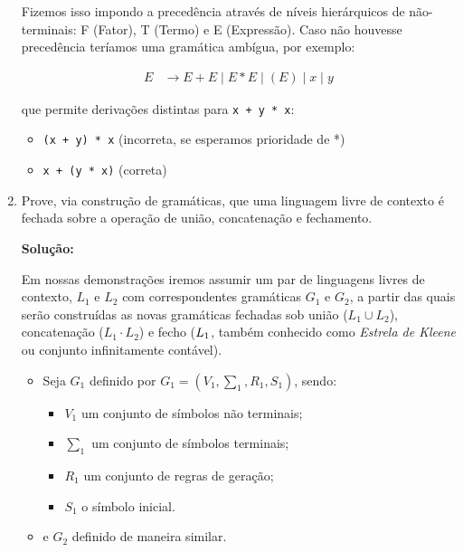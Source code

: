 \documentclass[12pt]{article}
\begin{document}
\begin{enumerate}
	      Fizemos isso impondo a precedência através de níveis hierárquicos de não-terminais: F (Fator), T (Termo) e E (Expressão). Caso não houvesse precedência teríamos uma gramática ambígua, por exemplo:
	      
	      \begin{align*}
		      E & \rightarrow E + E \mid E * E \mid (E) \mid x \mid y
	      \end{align*}
	      
	      que permite derivações distintas para \texttt{x + y * x}:
	      \begin{itemize}
		      \item \texttt{(x + y) * x} (incorreta, se esperamos prioridade de *)
		      \item \texttt{x + (y * x)} (correta)
	      \end{itemize}
	      
	\item Prove, via construção de gramáticas, que uma linguagem livre de contexto é fechada sobre a operação de união, concatenação e fechamento.
	      
	      \textbf{Solução:}
	      
	      Em nossas demonstrações iremos assumir um par de linguagens livres de
	      contexto, $L_1$ e $L_2$ com correspondentes gramáticas $G_1$ e $G_2$,
	      a partir das quais serão construídas as novas gramáticas fechadas sob
	      união ($L_1 \cup L_2$), concatenação ($L_1 \cdot L_2$) e fecho
	      ($L_1\*$, também conhecido como \textit{Estrela de Kleene} ou
	      conjunto infinitamente contável).
	      
	      \begin{itemize}
		      \item Seja $G_1$ definido por $G_1 = (V_1, \sum_1, R_1, S_1)$,
		            sendo:
		            \begin{itemize}
			            \item $V_1$ um conjunto de símbolos não terminais;
			            \item $\sum_1$ um conjunto de símbolos terminais;
			            \item $R_1$ um conjunto de regras de geração;
			            \item $S_1$ o símbolo inicial.
		            \end{itemize}
		      \item e $G_2$ definido de maneira similar.
	      \end{itemize}
	      

\end{enumerate}
\end{document}

